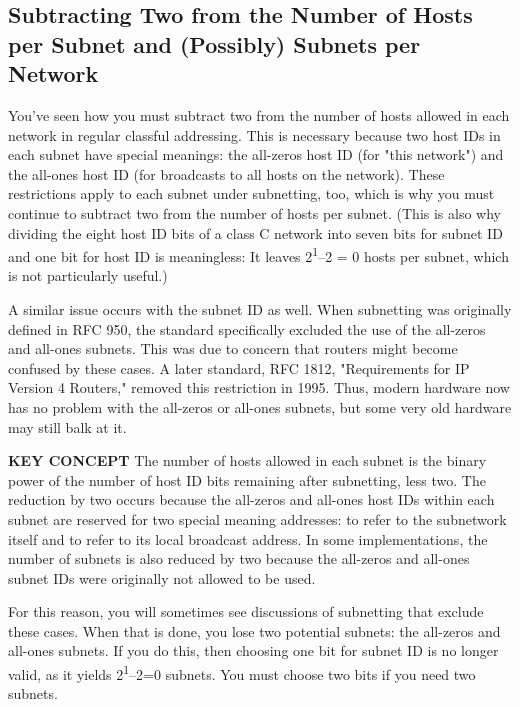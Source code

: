\documentclass[b5paper,11pt]{memoir}
\begin{document}
\subsection[Subtracting Two from the Number of Hosts per Subnet and
(Possibly) Subnets per
Network]{\texorpdfstring{\protect\hypertarget{ch18s05.htmlux5cux23subtracting_two_from_the_number_of_hosts}{}{}Subtracting
Two from the Number of Hosts per Subnet and (Possibly) Subnets per
Network}{Subtracting Two from the Number of Hosts per Subnet and (Possibly) Subnets per Network}}

You've seen how you must subtract two from the number of hosts allowed
in each network in regular classful addressing. This is necessary
because two host IDs in each subnet have special meanings: the all-zeros
host ID (for "this network") and the all-ones host ID (for broadcasts to
all hosts on the network). These restrictions apply to each subnet under
subnetting, too, which is why you must continue to subtract two from the
number of hosts per subnet. (This is also why dividing the eight host ID
bits of a class C network into seven bits for subnet ID and one bit for
host ID is meaningless: It leaves
2\protect\hypertarget{ch18s05.htmlux5cux23idx-CHP-18-0738}{}{}\textsuperscript{1}--2
= 0 hosts per subnet, which is not particularly useful.)

A similar issue occurs with the subnet ID as well. When subnetting was
originally defined in RFC 950, the standard specifically excluded the
use of the all-zeros and all-ones subnets. This was due to concern that
routers might become confused by these cases. A later standard, RFC
1812, "Requirements for IP Version 4 Routers," removed this restriction
in 1995. Thus, modern hardware now has no problem with the all-zeros or
all-ones subnets, but some very old hardware may still balk at it.


{\textbf{KEY CONCEPT}} The number of hosts allowed in each subnet is the
binary power of the number of host ID bits remaining after subnetting,
less two. The reduction by two occurs because the all-zeros and all-ones
host IDs within each subnet are reserved for two special meaning
addresses: to refer to the subnetwork itself and to refer to its local
broadcast address. In some implementations, the number of subnets is
also reduced by two because the all-zeros and all-ones subnet IDs were
originally not allowed to be used.

For this reason, you will sometimes see discussions of subnetting that
exclude these cases. When that is done, you lose two potential subnets:
the all-zeros and all-ones subnets. If you do this, then choosing one
bit for subnet ID is no longer valid, as it yields
2\textsuperscript{1}--2=0 subnets. You must choose two bits if you need
two subnets.
\end{document}
